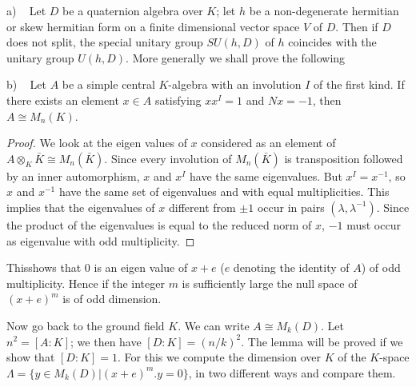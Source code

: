 \setcounter{lem}{0}
  \begin{lem}\label{chap2:lem1}%
a) ~ Let $D$ be a quaternion algebra over $K$; let $h$ be a
non-degenerate hermitian or skew hermitian form on a finite
dimensional vector space $V$ of $D$. Then if $D$ does not split, the
special unitary  group $SU(h,D)$ of $h$ coincides with the unitary
group $U(h,D)$. More generally we shall prove the following  
 \end{lem} 
 
\setcounter{lem}{0}
 \begin{lem}%
b) ~ Let $A$ be a simple central $K$-algebra with an involution $I$ of the
first kind. If there exists an element $x\in A$ satisfying $xx^I =1$
and $Nx=-1$, then $A \cong M_n(K)$.        
 \end{lem} 
 
\begin{proof}
We look at the eigen values of $x$ considered as an element of $A
\otimes_K\bar{K} \cong M_n(\bar{K})$. Since every involution
of $M_n(\bar{K})$ is transposition followed by an inner automorphism,
$x$ and $x^I$ have the same eigenvalues. But $x^I = x^{-1}$, so $x$
and  $x^{-1}$  have the same set of eigenvalues and with equal
multiplicities. This implies that the eigenvalues of $x$ different from
$\pm 1$ occur in pairs $(\lambda, \lambda^{-1})$. Since the product of
the eigenvalues is equal to the reduced norm of $x$, $-1$ must occur as
eigenvalue with odd multiplicity. 
\end{proof}

\noindent
This\pageoriginale shows that 0 is an eigen value of $x+e$ ($e$
denoting the identity of $A$) of odd multiplicity. Hence if the 
integer $m$ is sufficiently large the null space of $(x+e)^m$ is of
odd dimension.   

Now go back to the ground field $K$. We can write $A \cong M_k
(D)$. Let $n^2 = [A:K]$; we then have $[D:K]=(n/k)^2$. The lemma
will be proved if we show that $[D:K]=1$. For this we compute the
dimension over $K$ of the $K$-space $\Lambda =\{ y \in M_k (D) | (x+e)^m
.y=0\}$, in two different ways and compare them.  

